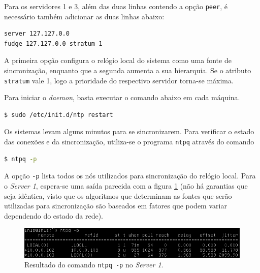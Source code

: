 \vspace{12pt}

Para os servidores 1 e 3, além das duas linhas contendo a opção \texttt{peer}, é
necessário também adicionar as duas linhas abaixo:

\begin{lstlisting}[language=bash, style=nonumbers]
server 127.127.0.0
fudge 127.127.0.0 stratum 1
\end{lstlisting}

A primeira opção configura o relógio local do sistema como uma fonte de
sincronização, enquanto que a segunda aumenta a sua hierarquia. Se o
atributo \texttt{stratum} vale 1, logo a prioridade do respectivo servidor
torna-se máxima.

\vspace{12pt}

Para iniciar o \textit{daemon}, basta executar o comando abaixo em cada máquina.

\begin{lstlisting}[language=bash, style=nonumbers]
$ sudo /etc/init.d/ntp restart
\end{lstlisting}

Os sistemas levam alguns minutos para se sincronizarem. Para verificar o estado
das conexões e da sincronização, utiliza-se o programa \texttt{ntpq} através do
comando 

\begin{lstlisting}[language=bash, style=nonumbers]
$ ntpq -p
\end{lstlisting}

A opção \texttt{-p} lista todos os nós utilizados para sincronização do relógio
local. Para o \textit{Server 1}, espera-se uma saída parecida com a figura
\ref{fig:sv1} (não há garantias que seja idêntica, visto que os algoritmos que
determinam as fontes que serão utilizadas para sincronização são baseados em
fatores que podem variar dependendo do estado da rede). 

\FloatBarrier

\begin{figure}[h]
    
    \centering
    \includegraphics[scale=0.7]{image/server1_screen}
    \caption {Resultado do comando \texttt{ntpq -p} no \textit{Server 1}.}
    \label{fig:sv1} 
\end{figure} 

